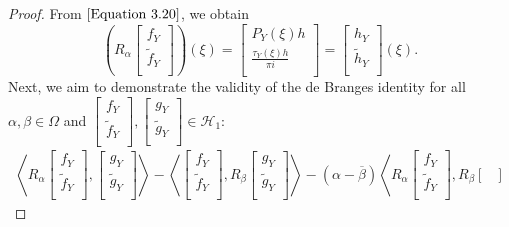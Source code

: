 \documentclass [12pt,reqno]{amsart}
\numberwithin{equation}{subsection}
\numberwithin{equation}{section}
\begin{document}
\begin{proof}
From $\eqref{Equation 3.20}$, we obtain $$  \left(R_{\alpha} \begin{bmatrix} 
    f_Y  \\
    \tilde{f}_Y \\
    \end{bmatrix}\right) (\xi)= \begin{bmatrix} 
    P_Y(\xi)h  \\
    \frac{\tau_Y(\xi)h}{\pi i} \\
    \end{bmatrix}    =  \begin{bmatrix} 
    h_Y  \\
    \tilde{h}_Y \\
    \end{bmatrix} (\xi).$$
Next, we aim to demonstrate the validity of the de Branges identity for all $\alpha, \beta \in \Omega$ and $\begin{bmatrix} 
f_Y  \\
\tilde{f}_Y \\
\end{bmatrix},  \begin{bmatrix} 
g_Y  \\
\tilde{g}_Y \\
\end{bmatrix} \in \mathcal{H}_1$: \begin{multline} \label{Equation 3.21}
\left\langle R_\alpha  \begin{bmatrix} 
	f_Y  \\
	\tilde{f}_Y\\
	\end{bmatrix},  \begin{bmatrix} 
	g_Y  \\
	\tilde{g}_Y \\
	\end{bmatrix} \right\rangle  -\left\langle  \begin{bmatrix} 
	f_Y  \\
	\tilde{f}_Y \\
	\end{bmatrix}, R_{\beta} \begin{bmatrix} 
	g_Y  \\
	\tilde{g}_Y \\
	\end{bmatrix} \right\rangle - (\alpha- \overline{\beta}) \left\langle R_{\alpha}\begin{bmatrix} 
	f_Y  \\
	\tilde{f}_Y \\
	\end{bmatrix},  R_{\beta}\begin{bmatrix} 

\end{bmatrix}
\end{multline}
\end{proof}
\end{document}
